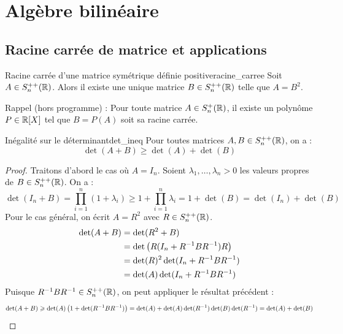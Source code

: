 \section{Algèbre bilinéaire}

\subsection{Racine carrée de matrice et applications}

\begin{theoreme}{Racine carrée d'une matrice symétrique définie positive}{racine_carree}
    Soit $A \in S_n^{++}(\mathbb{R})$. Alors il existe une unique matrice $B \in S_n^{++}(\mathbb{R})$ telle que $A = B^2$.
\end{theoreme}

\begin{remarque}
    Rappel (hors programme) : Pour toute matrice $A \in S_n^+(\mathbb{R})$, il existe un polynôme $P \in \mathbb{R}[X]$ tel que $B = P(A)$ soit sa racine carrée.
\end{remarque}

\begin{proposition}{Inégalité sur le déterminant}{det_ineq}
    Pour toutes matrices $A, B \in S_n^{++}(\mathbb{R})$, on a :
    \[ \det(A+B) \geqslant \det(A) + \det(B) \]
\end{proposition}

\begin{proof}
    Traitons d'abord le cas où $A = I_n$. Soient $\lambda_1, \dots, \lambda_n > 0$ les valeurs propres de $B \in S_n^{++}(\mathbb{R})$. On a :
    \[ \det(I_n + B) = \prod_{i=1}^n (1 + \lambda_i) \geqslant 1 + \prod_{i=1}^n \lambda_i = 1 + \det(B) = \det(I_n) + \det(B) \]
    Pour le cas général, on écrit $A = R^2$ avec $R \in S_n^{++}(\mathbb{R})$.
    \begin{align*}
        \det(A+B) &= \det(R^2 + B) \\
        &= \det\left(R(I_n + R^{-1}BR^{-1})R\right) \\
        &= \det(R)^2 \det(I_n + R^{-1}BR^{-1}) \\
        &= \det(A) \det(I_n + R^{-1}BR^{-1})
    \end{align*}
    Puisque $R^{-1}BR^{-1} \in S_n^{++}(\mathbb{R})$, on peut appliquer le résultat précédent :
    \[ \det(A+B) \geqslant \det(A)\left(1 + \det(R^{-1}BR^{-1})\right) = \det(A) + \det(A)\det(R^{-1})\det(B)\det(R^{-1}) = \det(A) + \det(B) \]
\end{proof}

